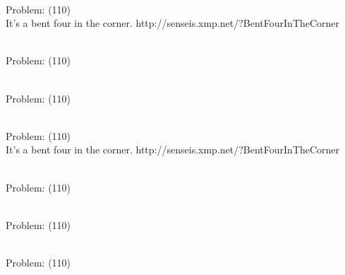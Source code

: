 \documentclass[11pt]{article}
\begin{document}
\begin{minipage}[t]{0.5\textwidth}
  {\centering
  
\\
Problem: (110)\\
It's a bent four in the corner. 
http://senseis.xmp.net/?BentFourInTheCorner\\
  }
\end{minipage}
\begin{minipage}[t]{0.5\textwidth}
  {\centering
  
\\
Problem: (110)\\
  }
\end{minipage}
\begin{minipage}[t]{0.5\textwidth}
  {\centering
  
\\
Problem: (110)\\
  }
\end{minipage}
\begin{minipage}[t]{0.5\textwidth}
  {\centering
  
\\
Problem: (110)\\
It's a bent four in the corner. 
http://senseis.xmp.net/?BentFourInTheCorner\\
  }
\end{minipage}
\begin{minipage}[t]{0.5\textwidth}
  {\centering
  
\\
Problem: (110)\\
  }
\end{minipage}
\begin{minipage}[t]{0.5\textwidth}
  {\centering
  
\\
Problem: (110)\\
  }
\end{minipage}
\begin{minipage}[t]{0.5\textwidth}
  {\centering
  
\\
Problem: (110)\\
  }
\end{minipage}
\end{document}
